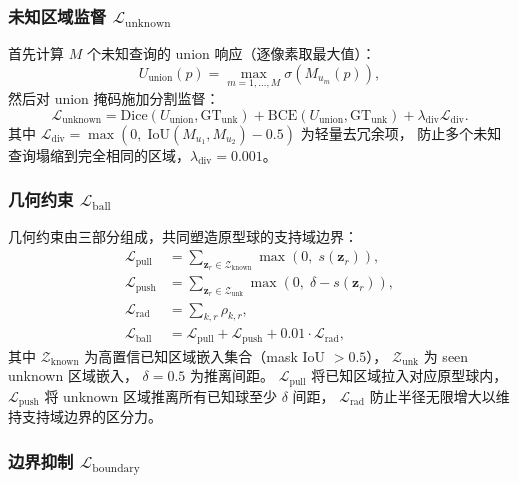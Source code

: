 \documentclass[3p,twocolumn,authoryear]{elsarticle}
\newcommand{\bz}{\mathbf{z}}                              %
\begin{document}
\subsubsection{未知区域监督 $\mathcal{L}_{\text{unknown}}$}\label{sec:method:loss:unknown}

首先计算 $M$ 个未知查询的 union 响应（逐像素取最大值）：
\begin{equation}\label{eq:u_union}
  U_{\text{union}}(p) = \max_{m=1,\ldots,M} \sigma\!\left(M_{u_m}(p)\right),
\end{equation}
然后对 union 掩码施加分割监督：
\begin{equation}\label{eq:loss_unknown}
  \mathcal{L}_{\text{unknown}} = \text{Dice}(U_{\text{union}}, \text{GT}_{\text{unk}}) + \text{BCE}(U_{\text{union}}, \text{GT}_{\text{unk}}) + \lambda_{\text{div}} \mathcal{L}_{\text{div}}.
\end{equation}
其中 $\mathcal{L}_{\text{div}} = \max\!\left(0,\; \text{IoU}(M_{u_1}, M_{u_2}) - 0.5\right)$ 为轻量去冗余项，
防止多个未知查询塌缩到完全相同的区域，$\lambda_{\text{div}} = 0.001$。

\subsubsection{几何约束 $\mathcal{L}_{\text{ball}}$}\label{sec:method:loss:ball}

几何约束由三部分组成，共同塑造原型球的支持域边界：
\begin{align}
  \mathcal{L}_{\text{pull}} &= \sum_{\bz_r \in \mathcal{Z}_{\text{known}}} \max\!\left(0,\; s(\bz_r)\right), \label{eq:loss_pull} \\
  \mathcal{L}_{\text{push}} &= \sum_{\bz_r \in \mathcal{Z}_{\text{unk}}} \max\!\left(0,\; \delta - s(\bz_r)\right), \label{eq:loss_push} \\
  \mathcal{L}_{\text{rad}} &= \sum_{k,r} \rho_{k,r}, \label{eq:loss_rad} \\
  \mathcal{L}_{\text{ball}} &= \mathcal{L}_{\text{pull}} + \mathcal{L}_{\text{push}} + 0.01 \cdot \mathcal{L}_{\text{rad}}, \label{eq:loss_ball}
\end{align}
其中 $\mathcal{Z}_{\text{known}}$ 为高置信已知区域嵌入集合（mask IoU $> 0.5$），
$\mathcal{Z}_{\text{unk}}$ 为 seen unknown 区域嵌入，
$\delta = 0.5$ 为推离间距。
$\mathcal{L}_{\text{pull}}$ 将已知区域拉入对应原型球内，
$\mathcal{L}_{\text{push}}$ 将 unknown 区域推离所有已知球至少 $\delta$ 间距，
$\mathcal{L}_{\text{rad}}$ 防止半径无限增大以维持支持域边界的区分力。

\subsubsection{边界抑制 $\mathcal{L}_{\text{boundary}}$}\label{sec:method:loss:boundary}
\end{document}
